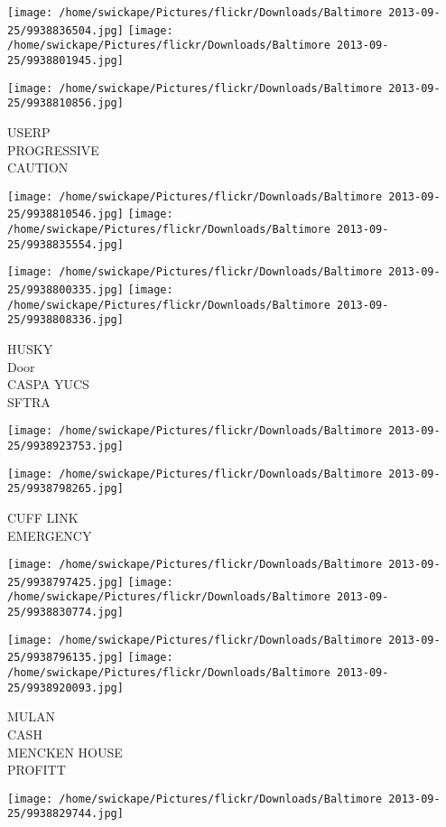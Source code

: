 \documentclass[10pt,letterpaper]{article}
\begin{document}
\texttt{[image: /home/swickape/Pictures/flickr/Downloads/Baltimore 2013-09-25/9938836504.jpg]}
\texttt{[image: /home/swickape/Pictures/flickr/Downloads/Baltimore 2013-09-25/9938801945.jpg]}

\vspace{0.25in}
\texttt{[image: /home/swickape/Pictures/flickr/Downloads/Baltimore 2013-09-25/9938810856.jpg]}

USERP\\
PROGRESSIVE\\
CAUTION
\pagebreak

\texttt{[image: /home/swickape/Pictures/flickr/Downloads/Baltimore 2013-09-25/9938810546.jpg]}
\texttt{[image: /home/swickape/Pictures/flickr/Downloads/Baltimore 2013-09-25/9938835554.jpg]}

\texttt{[image: /home/swickape/Pictures/flickr/Downloads/Baltimore 2013-09-25/9938800335.jpg]}
\texttt{[image: /home/swickape/Pictures/flickr/Downloads/Baltimore 2013-09-25/9938808336.jpg]}

HUSKY\\
Door\\
CASPA YUCS\\
SFTRA
\pagebreak

\texttt{[image: /home/swickape/Pictures/flickr/Downloads/Baltimore 2013-09-25/9938923753.jpg]}

\vspace{0.25in}
\texttt{[image: /home/swickape/Pictures/flickr/Downloads/Baltimore 2013-09-25/9938798265.jpg]}

CUFF LINK\\
EMERGENCY
\pagebreak

\texttt{[image: /home/swickape/Pictures/flickr/Downloads/Baltimore 2013-09-25/9938797425.jpg]}
\texttt{[image: /home/swickape/Pictures/flickr/Downloads/Baltimore 2013-09-25/9938830774.jpg]}

\texttt{[image: /home/swickape/Pictures/flickr/Downloads/Baltimore 2013-09-25/9938796135.jpg]}
\texttt{[image: /home/swickape/Pictures/flickr/Downloads/Baltimore 2013-09-25/9938920093.jpg]}

MULAN\\
CASH\\
MENCKEN HOUSE\\
PROFITT
\pagebreak

\texttt{[image: /home/swickape/Pictures/flickr/Downloads/Baltimore 2013-09-25/9938829744.jpg]}
\end{document}
